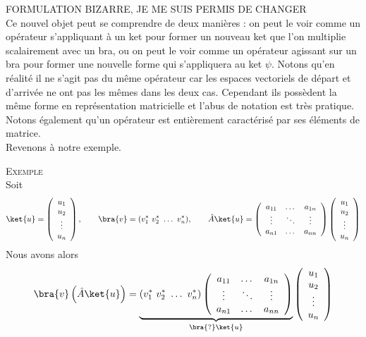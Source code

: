 
FORMULATION BIZARRE, JE ME SUIS PERMIS DE CHANGER\\

Ce nouvel objet peut se comprendre de deux manières : on peut le voir comme
un opérateur s'appliquant à un ket pour former un nouveau ket que l'on
multiplie scalairement avec un bra, ou on peut le voir comme un opérateur
agissant sur un bra pour former une nouvelle forme qui s'appliquera au ket $\psi$.
Notons qu'en réalité il ne s'agit pas du même opérateur car les espaces vectoriels
de départ et d'arrivée ne ont pas les mêmes dans les deux cas. Cependant ils possèdent
la même forme en représentation matricielle et l'abus de notation est très pratique.
Notons également qu'un opérateur est entièrement caractérisé par ses éléments de matrice.\\

Revenons à notre exemple.

\textsc{Exemple}\\
Soit
\begin{equation}
\ket{u} = \left(\begin{array}{c}
u_1\\
u_2\\
\vdots\\
u_n
\end{array}\right), \qquad \bra{v} = (v_1^*\ v_2^*\ \dots\ v_n^*), \qquad 
\hat{A}\ket{u} = \left(\begin{array}{ccc}
a_{11} & \dots & a_{1n}\\
\vdots &\ddots &\vdots\\
a_{n1} & \dots & a_{nn}
\end{array}\right)\left(\begin{array}{c}
u_1\\
u_2\\
\vdots\\
u_n
\end{array}\right)
\end{equation}
Nous avons alors
\begin{equation}
\bra{v}\left(\hat{A}\ket{u}\right) = \underbrace{(v_1^*\ v_2^*\ \dots\ v_n^*)\left(\begin{array}{ccc}
a_{11} & \dots & a_{1n}\\
\vdots &\ddots &\vdots\\
a_{n1} & \dots & a_{nn}
\end{array}\right)}_{\bra{?}\ket{u}}\left(\begin{array}{c}
u_1\\
u_2\\
\vdots\\
u_n
\end{array}\right)
\end{equation}

